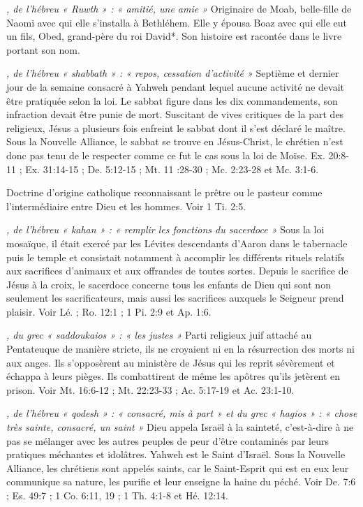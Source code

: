 \begin{multicols}{2}
{\textit{, de l'hébreu « Ruwth » : « amitié, une amie »}\newline
Originaire de Moab, belle-fille de Naomi avec qui elle s'installa à Bethléhem. Elle y épousa Boaz avec qui elle eut un fils, Obed, grand-père du roi David*. Son histoire est racontée dans le livre portant son nom.

\textit{, de l'hébreu « shabbath » : « repos, cessation d'activité »}\newline
Septième et dernier jour de la semaine consacré à Yahweh pendant lequel aucune activité ne devait être pratiquée selon la loi. Le sabbat figure dans les dix commandements, son infraction devait être punie de mort. Suscitant de vives critiques de la part des religieux, Jésus a plusieurs fois enfreint le sabbat dont il s'est déclaré le maître. Sous la Nouvelle Alliance, le sabbat se trouve en Jésus-Christ, le chrétien n'est donc pas tenu de le respecter comme ce fut le cas sous la loi de Moïse. Ex. 20:8-11 ; Ex. 31:14-15 ; De. 5:12-15 ; Mt. 11 :28-30 ; Mc. 2:23-28 et Mc. 3:1-6.

\textit{}\newline
Doctrine d'origine catholique reconnaissant le prêtre ou le pasteur comme l'intermédiaire entre Dieu et les hommes. Voir 1 Ti. 2:5.

\textit{, de l'hébreu « kahan » : « remplir les fonctions du sacerdoce »}\newline
Sous la loi mosaïque, il était exercé par les Lévites descendants d'Aaron dans le tabernacle puis le temple et consistait notamment à accomplir les différents rituels relatifs aux sacrifices d'animaux et aux offrandes de toutes sortes. Depuis le sacrifice de Jésus à la croix, le sacerdoce concerne tous les enfants de Dieu qui sont non seulement les sacrificateurs, mais aussi les sacrifices auxquels le Seigneur prend plaisir. Voir Lé. ; Ro. 12:1 ; 1 Pi. 2:9 et Ap. 1:6.

\textit{, du grec « saddoukaios » : « les justes »}\newline
Parti religieux juif attaché au Pentateuque de manière stricte, ils ne croyaient ni en la résurrection des morts ni aux anges. Ils s'opposèrent au ministère de Jésus qui les reprit sévèrement et échappa à leurs pièges. Ils combattirent de même les apôtres qu'ils jetèrent en prison. Voir Mt. 16:6-12 ; Mt. 22:23-33 ; Ac. 5:17-19 et Ac. 23:1-10.

\textit{, de l'hébreu « qodesh » : « consacré, mis à part » et du grec « hagios » : « chose très sainte, consacré, un saint »}\newline
Dieu appela Israël à la sainteté, c'est-à-dire à ne pas se mélanger avec les autres peuples de peur d'être contaminés par leurs pratiques méchantes et idolâtres. Yahweh est le Saint d'Israël. Sous la Nouvelle Alliance, les chrétiens sont appelés saints, car le Saint-Esprit qui est en eux leur communique sa nature, les purifie et leur enseigne la haine du péché. Voir De. 7:6 ; Es. 49:7 ; 1 Co. 6:11, 19 ; 1 Th. 4:1-8 et Hé. 12:14.

}
\end{multicols}
